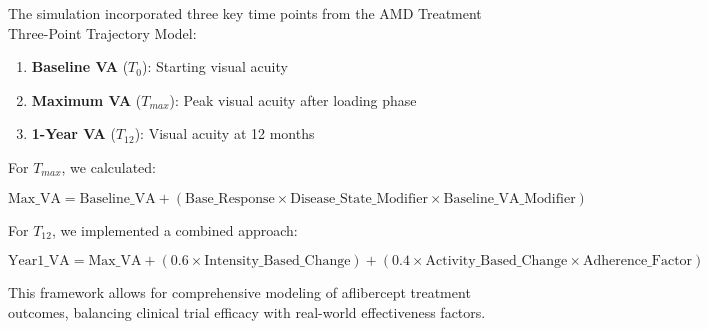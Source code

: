 The simulation incorporated three key time points from the AMD Treatment Three-Point Trajectory Model:

\begin{enumerate}
    \item \textbf{Baseline VA} ($T_0$): Starting visual acuity
    \item \textbf{Maximum VA} ($T_{max}$): Peak visual acuity after loading phase
    \item \textbf{1-Year VA} ($T_{12}$): Visual acuity at 12 months
\end{enumerate}

For $T_{max}$, we calculated:

\begin{equation*}
\text{Max\_VA} = \text{Baseline\_VA} + (\text{Base\_Response} \times \text{Disease\_State\_Modifier} \times \text{Baseline\_VA\_Modifier})
\end{equation*}

For $T_{12}$, we implemented a combined approach:

\begin{equation*}
\text{Year1\_VA} = \text{Max\_VA} + (0.6 \times \text{Intensity\_Based\_Change}) + (0.4 \times \text{Activity\_Based\_Change} \times \text{Adherence\_Factor})
\end{equation*}

This framework allows for comprehensive modeling of aflibercept treatment outcomes, balancing clinical trial efficacy with real-world effectiveness factors.
